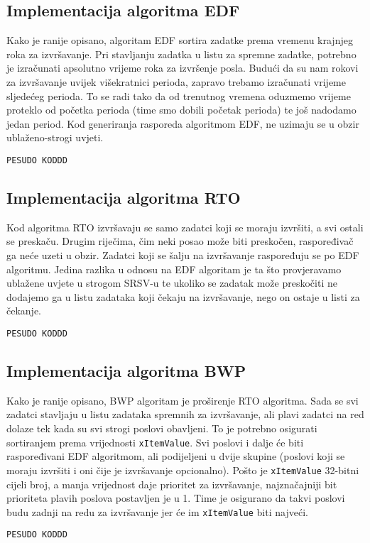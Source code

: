 \documentclass[../zavrsni.tex]{subfiles}
\begin{document}
\subsection{Implementacija algoritma EDF}

Kako je ranije opisano, algoritam EDF sortira zadatke prema vremenu krajnjeg roka za izvršavanje. Pri stavljanju zadatka u 
listu za spremne zadatke, potrebno je izračunati apsolutno vrijeme roka za izvršenje posla. Budući da su nam rokovi za izvršavanje
uvijek višekratnici perioda, zapravo trebamo izračunati vrijeme sljedećeg perioda. To se radi tako da od trenutnog vremena 
oduzmemo vrijeme proteklo od početka perioda (time smo dobili početak perioda) te još nadodamo jedan period. 
Kod generiranja rasporeda algoritmom EDF, ne uzimaju se u obzir ublaženo-strogi uvjeti.

\begin{lstlisting}[style=CStyle,caption={Pseudokod implementacije algoritma EDF},captionpos=b]
PESUDO KODDD
\end{lstlisting}


\subsection{Implementacija algoritma RTO}

Kod algoritma RTO izvršavaju se samo zadatci koji se moraju izvršiti, a svi ostali se preskaču. Drugim riječima, čim neki posao 
može biti preskočen, raspoređivač ga neće uzeti u obzir. Zadatci koji se šalju na izvršavanje raspoređuju se po EDF algoritmu. Jedina razlika u odnosu
na EDF algoritam je ta što provjeravamo ublažene uvjete u strogom SRSV-u te ukoliko se zadatak može preskočiti ne dodajemo ga u 
listu zadataka koji čekaju na izvršavanje, nego on ostaje u listi za čekanje. 

\begin{lstlisting}[style=CStyle,caption={Pseudokod implementacije algoritma RTO},captionpos=b]
  PESUDO KODDD
\end{lstlisting}

\subsection{Implementacija algoritma BWP}

Kako je ranije opisano, BWP algoritam je proširenje RTO algoritma. Sada se svi zadatci stavljaju u listu zadataka spremnih za izvršavanje,
ali plavi zadatci na red dolaze tek kada su svi strogi poslovi obavljeni. To je potrebno osigurati sortiranjem prema vrijednosti
\texttt{xItemValue}. Svi poslovi i dalje će biti raspoređivani EDF algoritmom, ali podijeljeni u dvije skupine (poslovi koji se moraju
izvršiti i oni čije je izvršavanje opcionalno). Pošto je \texttt{xItemValue} 32-bitni cijeli broj, a manja vrijednost daje prioritet
za izvršavanje, najznačajniji bit prioriteta plavih poslova postavljen je u 1. Time je osigurano da takvi poslovi budu 
zadnji na redu za izvršavanje jer će im \texttt{xItemValue} biti najveći.  

\begin{lstlisting}[style=CStyle,caption={Pseudokod implementacije algoritma BWP},captionpos=b]
  PESUDO KODDD
\end{lstlisting}
\end{document}
